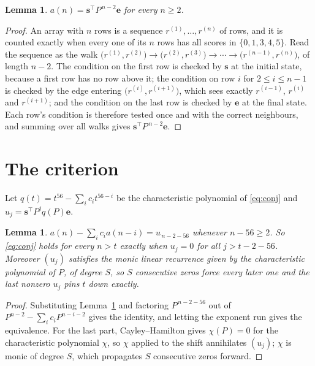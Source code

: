 \documentclass[11pt,a4paper]{article}
\theoremstyle{plain}
\newtheorem{lemma}[theorem]{Lemma}
\theoremstyle{definition}
\begin{document}
\begin{lemma}\label{lem:walk}
$a(n)=\mathbf{s}^{\!\top}P^{\,n-2}\mathbf{e}$ for every $n\ge2$.
\end{lemma}

\begin{proof}
An array with $n$ rows is a sequence $r^{(1)},\dots,r^{(n)}$ of rows, and it is counted
exactly when every one of its $n$ rows has all scores in $\{0,1,3,4,5\}$. Read the sequence as the
walk $\bigl(r^{(1)},r^{(2)}\bigr)\to\bigl(r^{(2)},r^{(3)}\bigr)\to\cdots\to
\bigl(r^{(n-1)},r^{(n)}\bigr)$, of length $n-2$. The condition on the first row is
checked by $\mathbf{s}$ at the initial state, because a first row has no row above it; the
condition on row $i$ for $2\le i\le n-1$ is checked by the edge entering
$\bigl(r^{(i)},r^{(i+1)}\bigr)$, which sees exactly $r^{(i-1)}$, $r^{(i)}$ and
$r^{(i+1)}$; and the condition on the last row is checked by $\mathbf{e}$ at the final
state. Each row's condition is therefore tested once and with the correct neighbours, and
summing over all walks gives $\mathbf{s}^{\!\top}P^{\,n-2}\mathbf{e}$.
\end{proof}

\section{The criterion}

Let $q(t)=t^{56}-\sum_i c_i t^{56-i}$ be the characteristic polynomial of
\eqref{eq:conj} and $u_j=\mathbf{s}^{\!\top}P^{j}q(P)\mathbf{e}$.

\begin{lemma}\label{lem:crit}
$a(n)-\sum_i c_i a(n-i)=u_{\,n-2-56}$ whenever $n-56\ge2$. So \eqref{eq:conj}
holds for every $n>t$ exactly when $u_j=0$ for all $j>t-2-56$. Moreover $(u_j)$
satisfies the monic linear recurrence given by the characteristic polynomial of $P$, of
degree $S$, so $S$ consecutive zeros force every later one and the last nonzero $u_j$ pins
$t$ down exactly.
\end{lemma}

\begin{proof}
Substituting Lemma~\ref{lem:walk} and factoring $P^{\,n-2-56}$ out of
$P^{n-2}-\sum_i c_i P^{n-i-2}$ gives the identity, and letting the exponent run gives the
equivalence. For the last part, Cayley--Hamilton gives $\chi(P)=0$ for the characteristic
polynomial $\chi$, so $\chi$ applied to the shift annihilates $(u_j)$; $\chi$ is monic of
degree $S$, which propagates $S$ consecutive zeros forward.
\end{proof}
\end{document}
